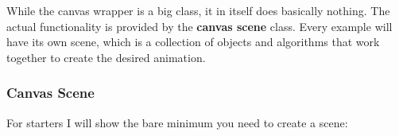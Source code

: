 While the canvas wrapper is a big class, it in itself does basically nothing. The actual functionality is provided by the \textbf{canvas scene} class. Every example will have its own scene, which is a collection of objects and algorithms that work together to create the desired animation.

\pagebreak

\subsubsection{Canvas Scene}
\label{subsubsec:canvas-scene}

For starters I will show the bare minimum you need to create a scene:

\inputminted{typescript}{code/minimum-scene.tex}
